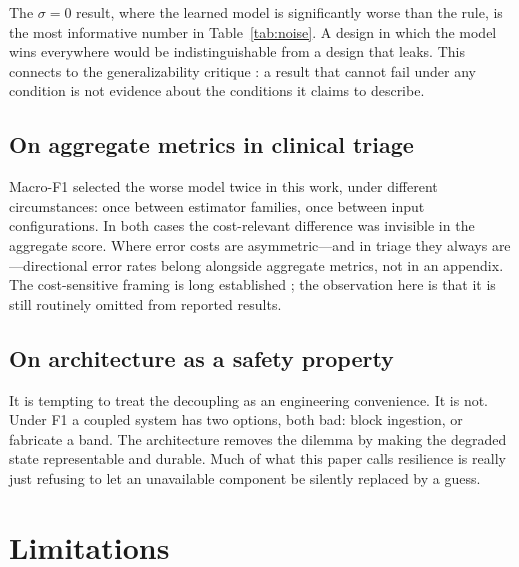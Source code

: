 \documentclass[lettersize,journal]{IEEEtran}
\begin{document}
The $\sigma = 0$ result, where the learned model is significantly worse than the
rule, is the most informative number in Table~\ref{tab:noise}. A design in which
the model wins everywhere would be indistinguishable from a design that leaks.
This connects to the generalizability critique \cite{futoma2020}: a result that
cannot fail under any condition is not evidence about the conditions it claims
to describe.

\subsection{On aggregate metrics in clinical triage}

Macro-F1 selected the worse model twice in this work, under different
circumstances: once between estimator families, once between input
configurations. In both cases the cost-relevant difference was invisible in the
aggregate score. Where error costs are asymmetric---and in triage they always
are---directional error rates belong alongside aggregate metrics, not in an
appendix. The cost-sensitive framing is long established \cite{he2009, ting2002};
the observation
here is that it is still routinely omitted from reported results.

\subsection{On architecture as a safety property}

It is tempting to treat the decoupling as an engineering convenience. It is not.
Under F1 a coupled system has two options, both bad: block ingestion, or
fabricate a band. The architecture removes the dilemma by making the degraded
state representable and durable. Much of what this paper calls resilience is
really just refusing to let an unavailable component be silently replaced by a
guess.

\section{Limitations}
\label{sec:limits}
\end{document}
